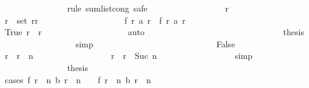 \begin{isabellebody}
\ \ \ \ \ \ \ \ \ \ \ \ \ \ \isamarkupfalse%
\ {\isacharparenleft}rule\ sum{\isacharunderscore}list{\isacharunderscore}cong{\isacharcomma}\ safe{\isacharparenright}\isanewline
\ \ \ \ \ \ \ \ \ \ \ \ \ \ \ \ \isamarkupfalse%
\ r{\isacharprime}\isanewline
\ \ \ \ \ \ \ \ \ \ \ \ \ \ \ \ \isamarkupfalse%
\ {\isachardoublequoteopen}r{\isacharprime}\ {\isasymin}\ set\ {\isacharbrackleft}r{}{\isachardot}{\isachardot}{\isacharless}r\ {\isacharplus}\ {}{\isacharbrackright}{\isachardoublequoteclose}\isanewline
\ \ \ \ \ \ \ \ \ \ \ \ \ \ \ \ \isamarkupfalse%
\ {\isachardoublequoteopen}f\ r{\isacharprime}\ {\isacharparenleft}a\ r{\isacharprime}{\isacharparenright}\ {\isacharequal}\ f\ r{\isacharprime}\ {\isacharparenleft}{\isacharquery}a\ r{\isacharprime}{\isacharparenright}{\isachardoublequoteclose}\isanewline
\ \ \ \ \ \ \ \ \ \ \ \ \ \ \ \ \ \ \isamarkupfalse%
\ True\ {\isacharbackquoteopen}r{}\ {\isasymle}\ r{\isacharbackquoteclose}\isanewline
\ \ \ \ \ \ \ \ \ \ \ \ \ \ \ \ \ \ \isamarkupfalse%
\ auto\isanewline
\ \ \ \ \ \ \ \ \ \ \ \ \ \ \isamarkupfalse%
\isanewline
\ \ \ \ \ \ \ \ \ \ \ \ \ \ \isamarkupfalse%
\ \isamarkupfalse%
\ {\isacharquery}thesis\isanewline
\ \ \ \ \ \ \ \ \ \ \ \ \ \ \ \ \isamarkupfalse%
\ simp\isanewline
\ \ \ \ \ \ \ \ \ \ \ \ \isamarkupfalse%
\isanewline
\ \ \ \ \ \ \ \ \ \ \ \ \ \ \isamarkupfalse%
\ False\isanewline
\ \ \ \ \ \ \ \ \ \ \ \ \ \ \isamarkupfalse%
\ {\isachardoublequoteopen}r\ {\isacharequal}\ r{}\ {\isacharplus}\ n{\isachardoublequoteclose}\isanewline
\ \ \ \ \ \ \ \ \ \ \ \ \ \ \ \ \isamarkupfalse%
\ {\isacharbackquoteopen}r\ {\isacharless}\ r{}\ {\isacharplus}\ Suc\ n{\isacharbackquoteclose}\isanewline
\ \ \ \ \ \ \ \ \ \ \ \ \ \ \ \ \isamarkupfalse%
\ simp\isanewline
\ \ \ \ \ \ \ \ \ \ \ \ \ \ \isamarkupfalse%
\ {\isacharquery}thesis\isanewline
\ \ \ \ \ \ \ \ \ \ \ \ \ \ \isamarkupfalse%
\ {\isacharparenleft}cases\ {\isachardoublequoteopen}f\ {\isacharparenleft}r{}\ {\isacharplus}\ n{\isacharparenright}\ {\isacharparenleft}b\ {\isacharparenleft}r{}\ {\isacharplus}\ n\ {\isacharminus}\ {}{\isacharparenright}{\isacharparenright}\ {\isacharless}\ f\ {\isacharparenleft}r{}\ {\isacharplus}\ n{\isacharparenright}\ {\isacharparenleft}b\ {\isacharparenleft}r{}\ {\isacharplus}\ n\ {\isacharminus}\ {}{\isacharparenright}\ {\isacharplus}\ {}{\isacharparenright}{\isachardoublequoteclose}{\isacharparenright}\isanewline

\end{isabellebody}
